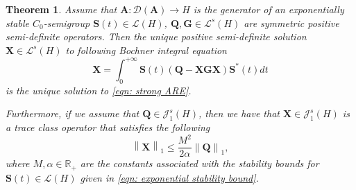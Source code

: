 \documentclass{amsart}
\newcommand{\sL}{\mathscr L}
\newcommand{\sJ}{\mathscr J}
\newcommand{\p}[1]{\left( {#1} \right)}
\newcommand{\norm}[1]{\left\| #1 \right\|}
\newcommand{\bA}{\mathbf A}
\newcommand{\bX}{\mathbf X}
\newcommand{\bQ}{\mathbf Q}
\newcommand{\bG}{\mathbf G}
\newcommand{\bS}{\mathbf S}
\newtheorem{theorem}{Theorem}
\begin{document}
\begin{theorem} \label{theorem: ARE well-posedness}
Assume that $\bA : \mathcal D(\bA) \rightarrow H$ is the generator of an exponentially stable $C_0$-semigroup $\bS(t)\in \sL(H)$, $\bQ, \bG \in \sL^s(H)$ are symmetric positive semi-definite operators. Then the unique positive semi-definite solution $\bX \in \sL^s(H)$ to following Bochner integral equation
\begin{equation} \label{eqn: Bochner ARE}
    \bX = \int_0^{+\infty} \bS(t)\p{\bQ - \bX \bG \bX}\bS^*(t)dt
\end{equation}
is the unique solution to \eqref{eqn: strong ARE}. 

Furthermore, if we assume that $\bQ \in \sJ^s_1(H)$, then we have that $\bX \in \sJ_1^s(H)$ is a trace class operator that satisfies the following
\begin{equation} \label{eqn: ARE solution bound}
    \norm{\bX}_{1} \leq \frac{M^2}{2\alpha} \norm{\bQ}_{1},
\end{equation}
where $M,\alpha \in \mathbb R_+$ are the constants associated with the stability bounds for $\bS(t) \in \sL(H)$ given in \eqref{eqn: exponential stability bound}.
\end{theorem}
\end{document}
